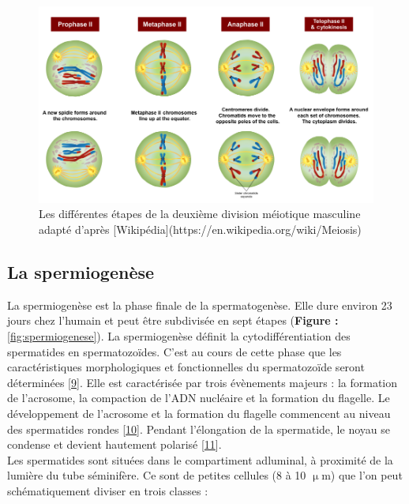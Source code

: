 \documentclass[12pt,twoside]{reedthesis}
\theoremstyle{definition}
\theoremstyle{definition}
\theoremstyle{remark}
\begin{document}
  \begin{figure}
  
  {\centering \includegraphics[scale=0.43]{figure/MeiosisII} 
  
  }
  
  \caption[Les différentes étapes de la deuxième division méiotique masculine adapté]{Les différentes étapes de la deuxième division méiotique masculine adapté d'après [Wikipédia](https://en.wikipedia.org/wiki/Meiosis)}\label{fig:meioseii}
  \end{figure}
  
  \newpage
  
  \hypertarget{spermiogenese}{\subsection{La
  spermiogenèse}\label{spermiogenese}}
  
  La spermiogenèse est la phase finale de la spermatogenèse. Elle dure
  environ 23 jours chez l'humain et peut être subdivisée en sept étapes
  (\textbf{Figure : }\ref{fig:spermiogenese}). La spermiogenèse définit la
  cytodifférentiation des spermatides en spermatozoïdes. C'est au cours de
  cette phase que les caractéristiques morphologiques et fonctionnelles du
  spermatozoïde seront déterminées
  {[}\protect\hyperlink{ref-YvesClermontRichardOko1993}{9}{]}. Elle est
  caractérisée par trois évènements majeurs : la formation de l'acrosome,
  la compaction de l'ADN nucléaire et la formation du flagelle. Le
  développement de l'acrosome et la formation du flagelle commencent au
  niveau des spermatides rondes
  {[}\protect\hyperlink{ref-Escalier1991}{10}{]}. Pendant l'élongation de
  la spermatide, le noyau se condense et devient hautement polarisé
  {[}\protect\hyperlink{ref-Hamilton1987}{11}{]}.\\
  Les spermatides sont situées dans le compartiment adluminal, à proximité
  de la lumière du tube séminifère. Ce sont de petites cellules (8 à 10
  \(\upmu\)m) que l'on peut schématiquement diviser en trois classes :
  
\end{document}
